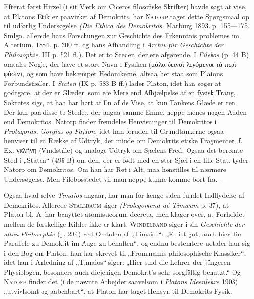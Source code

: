 \documentclass[12pt,a4paper,openany]{book}
\newcommand{\opage}[1]{\marginnote{\footnotesize\textit{[#1]}}}
\begin{document}
Efterat først Hirzel (i sit Værk om Ciceros filosofiske
Skrifter) havde søgt at vise, at Platons Etik er paavirket af Demokrits,
har \textsc{Natorp} taget dette Spørgsmaal op til udførlig Undersøgelse
\textit{(Die Ethica des Demokritos.} Marburg 1893. p. 155---175.
Smlgn. allerede hans Forschungen zur Geschichte des Erkenntnis%
\setcounter{footnote}{0}%
\opage{97}problemes im Altertum. 1884. p. 200 ff. og hans Afhandling i
\textit{Archiv für Geschichte der Philosophie.} III p. 521 fl.). Det er to
Steder, der ere afgørende. I \textit{Filebos} (p. 44 B) omtales Nogle,
der have et stort Navn i Fysiken (μάλα δεινοὶ λεγόμενοι τὰ περὶ
φύσιν), og som have bekæmpet Hedonikerne, altsaa her staa
som Platons Forbundsfæller. I \textit{Staten} (IX p. 583 B ff.) lader
Platon, idet han søger at godtgøre, at der er Glæder, som ere
Mere end Afhjælpelse af en fysisk Trang, Sokrates sige, at han
har hørt af En af de Vise, at kun Tankens Glæde er ren.
Der kan paa disse to Steder, der angaa samme Emne, neppe
menes nogen Anden end Demokritos. Natorp finder fremdeles
Henvisninger til Demokritos i \textit{Protagoras, Gorgias og Fajdon,}
idet han foruden til Grundtankerne ogsaa henviser til en Række
af Udtryk, der minde om Demokrits etiske Fragmenter, f. Ex.
γαλήνη (Vindstille) og analoge Udtryk om Sjælens Fred. Ogsaa
det berømte Sted i „Staten“ (496 B) om den, der er født
med en stor Sjæl i en lille Stat, tyder Natorp om Demokritos.
Om han har Ret i Alt, maa henstilles til nærmere Undersøgelse.
Men Filebosstedet vil man neppe kunne komme bort fra. ---

Ogsaa hvad selve \textit{Timaios} angaar, har man for længe siden
fundet Indflydelse af Demokritos. Allerede \textsc{Stallbaum} siger
\textit{(Prolegomena ad Timæum} p. 37), at Platon bl. A. har benyttet
atomisticorum decreta, men klager over, at Forholdet mellem de
forskellige Kilder ikke er klart. \textsc{Windelband} siger i sin \textit{Geschichte
der alten Philosophie} (p. 234) ved Omtalen af „Timaios“:
„Es ist gut, auch hier die Parallele zu Demokrit im Auge zu
behalten“, og endnu bestemtere udtaler han sig i den Bog om
Platon, han har skrevet til „Frommanns philosophische Klassiker“,
idet han i Anledning af „Timaios“ siger: „Hier sind
die Lehren der jüngeren Physiologen, besonders auch diejenigen
Demokrit’s sehr sorgfältig benutzt.“ Og \textsc{Natorp} finder det (i
de nævnte Arbejder saavelsom i \textit{Platons Ideenlehre} 1903) „utvivlsomt
og aabenbart“, at Platon har taget Hensyn til Demokrits
Fysik.
\end{document}
